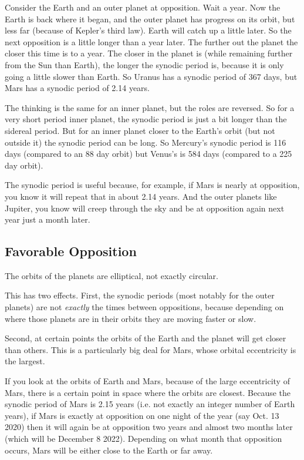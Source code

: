 \documentclass[12pt, preprint]{aastex}
\begin{document}
Consider the Earth and an outer planet at opposition. Wait a year. Now
the Earth is back where it began, and the outer planet has progress on
its orbit, but less far (because of Kepler's third law). Earth will
catch up a little later. So the next opposition is a little longer
than a year later. The further out the planet the closer this time is
to a year. The closer in the planet is (while remaining further from
the Sun than Earth), the longer the synodic period is, because it is
only going a little slower than Earth. So Uranus has a synodic period
of 367 days, but Mars has a synodic period of 2.14 years.

The thinking is the same for an inner planet, but the roles are
reversed. So for a very short period inner planet, the synodic period
is just a bit longer than the sidereal period. But for an inner planet
closer to the Earth's orbit (but not outside it) the synodic period
can be long. So Mercury's synodic period is 116 days (compared to an
88 day orbit) but Venus's is 584 days (compared to a 225 day orbit).

The synodic period is useful because, for example, if Mars is nearly
at opposition, you know it will repeat that in about 2.14 years. And
the outer planets like Jupiter, you know will creep through the sky
and be at opposition again next year just a month later.

\subsection{Favorable Opposition}

The orbits of the planets are elliptical, not exactly circular.

This has two effects. First, the synodic periods (most notably for the
outer planets) are not {\it exactly} the times between oppositions,
because depending on where those planets are in their orbits they are
moving faster or slow.

Second, at certain points the orbits of the Earth and the planet will
get closer than others. This is a particularly big deal for Mars, whose
orbital eccentricity is the largest.

If you look at the orbits of Earth and Mars, because of the large
eccentricity of Mars, there is a certain point in space where the
orbits are closest. Because the synodic period of Mars is 2.15 years
(i.e. not exactly an integer number of Earth years), if Mars is
exactly at opposition on one night of the year (say Oct. 13 2020) then
it will again be at opposition two years and almost two months later
(which will be December 8 2022). Depending on what month that
opposition occurs, Mars will be either close to the Earth or far away.
\end{document}
